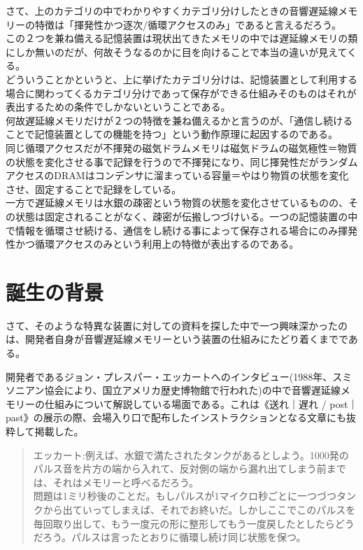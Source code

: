 \documentclass[a4paper,report]{jsbook}
\begin{document}
さて、上のカテゴリの中でわかりやすくカテゴリ分けしたときの音響遅延線メモリーの特徴は「揮発性かつ逐次/循環アクセスのみ」であると言えるだろう。\\
この２つを兼ね備える記憶装置は現状出てきたメモリの中では遅延線メモリの類にしか無いのだが、何故そうなるのかに目を向けることで本当の違いが見えてくる。\\
どういうことかというと、上に挙げたカテゴリ分けは、記憶装置として利用する場合に関わってくるカテゴリ分けであって保存ができる仕組みそのものはそれが表出するための条件でしかないということである。\\
何故遅延線メモリだけが２つの特徴を兼ね備えるかと言うのが、「通信し続けることで記憶装置としての機能を持つ」という動作原理に起因するのである。\\
同じ循環アクセスだが不揮発の磁気ドラムメモリは磁気ドラムの磁気極性＝物質の状態を変化させる事で記録を行うので不揮発になり、同じ揮発性だがランダムアクセスのDRAMはコンデンサに溜まっている容量＝やはり物質の状態を変化させ、固定することで記録をしている。\\
一方で遅延線メモリは水銀の疎密という物質の状態を変化させているものの、その状態は固定されることがなく、疎密が伝搬しつづけいる。一つの記憶装置の中で情報を循環させ続ける、通信をし続ける事によって保存される場合にのみ揮発性かつ循環アクセスのみという利用上の特徴が表出するのである。

\section{誕生の背景}\label{ux8a95ux751fux306eux80ccux666f}

さて、そのような特異な装置に対しての資料を探した中で一つ興味深かったのは、開発者自身が音響遅延線メモリーという装置の仕組みにたどり着くまでである。

開発者であるジョン・プレスパー・エッカートへのインタビュー(1988年、スミソニアン協会により、国立アメリカ歴史博物館で行われた)の中で音響遅延線メモリーの仕組みについて解説している場面である。これは《送れ｜遅れ
/
post｜past》の展示の際、会場入り口で配布したインストラクションとなる文章にも抜粋して掲載した。

\begin{quote}
エッカート:例えば、水銀で満たされたタンクがあるとしよう。1000発のパルス音を片方の端から入れて、反対側の端から漏れ出てしまう前までは、それはメモリーと呼べるだろう。\\
問題は1ミリ秒後のことだ。もしパルスが1マイクロ秒ごとに一つづつタンクから出ていってしまえば、それでお終いだ。しかしここでこのパルスを毎回取り出して、もう一度元の形に整形してもう一度戻したとしたらどうだろう。パルスは言ったとおりに循環し続け同じ状態を保つ。
\end{quote}
\end{document}
